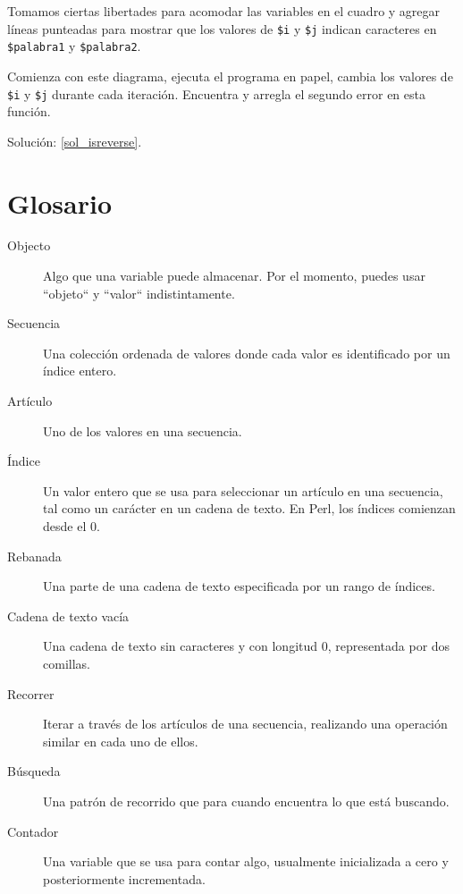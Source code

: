 Tomamos ciertas libertades para acomodar las variables en
el cuadro y agregar líneas punteadas para mostrar que los valores de
{\tt \$i} y {\tt \$j} indican caracteres en {\tt \$palabra1} y
{\tt \$palabra2}.

Comienza con este diagrama, ejecuta el programa en papel, 
cambia los valores de {\tt \$i} y {\tt \$j} durante cada iteración.
Encuentra y arregla el segundo error en esta función.

Solución: \ref{sol_isreverse}.
\label{isreverse}


\section{Glosario}

\begin{description}

\item[Objecto] Algo que una variable puede almacenar. 
Por el momento, puedes usar ``objeto`` y ``valor`` indistintamente.

\item[Secuencia] Una colección ordenada de valores donde cada valor
es identificado por un índice entero.

\item[Artículo] Uno de los valores en una secuencia.

\item[Índice] Un valor entero que se usa para seleccionar un
artículo en una secuencia, tal como un carácter en un cadena 
de texto. En Perl, los índices comienzan desde el 0.

\item[Rebanada] Una parte de una cadena de texto especificada por un
rango de índices.

\item[Cadena de texto vacía] Una cadena de texto sin caracteres y con longitud 0,
representada por dos comillas.

\item[Recorrer] Iterar a través de los artículos de una secuencia,
realizando una operación similar en cada uno de ellos.

\item[Búsqueda] Una patrón de recorrido que para cuando encuentra
lo que está buscando.

\item[Contador] Una variable que se usa para contar algo, usualmente
inicializada a cero y posteriormente incrementada.


\end{description}
